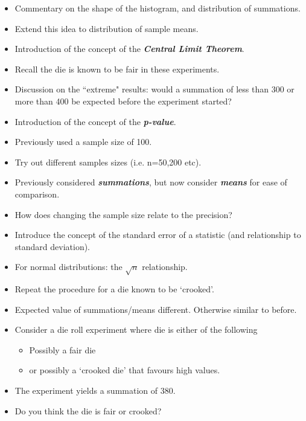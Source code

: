 \begin{frame}{\bf {}}
\begin{itemize}\itemsep0.3cm
\item Commentary on the shape of the histogram, and distribution of summations.
\item Extend this idea to distribution of sample means.
\item Introduction of the concept of the \textbf{\emph{Central Limit Theorem}}.
\item Recall the die is known to be fair in these experiments.
\item Discussion on the ``extreme" results: would a summation of less than 300 or more than 400 be expected before the experiment started?
\item Introduction of the concept of the \textbf{\emph{p-value}}.
\end{itemize}
\end{frame}
\begin{frame}{\bf {}}
\begin{itemize}\itemsep0.3cm
\item Previously used a sample size of 100.
\item Try out different samples sizes (i.e. n=50,200 etc).
\item Previously considered \textbf{\emph{summations}}, but now consider \textbf{\emph{means}} for ease of comparison.
\item How does changing the sample size relate to the precision?

\item Introduce the concept of the standard error of a statistic (and relationship to standard deviation).
\item For normal distributions: the $\sqrt{n}$ relationship.
\end{itemize}
\end{frame}


\begin{frame}{\bf {}}
\begin{itemize}\itemsep0.3cm
\item Repeat the procedure for a die known to be `crooked'.
\item Expected value of summations/means different. Otherwise similar to before.
\item Consider a die roll experiment where die is either of the following
 \begin{itemize} \item Possibly a fair die \item or possibly a `crooked die' that favours high values.
\end{itemize}
\item The experiment yields a summation of 380.
\item Do you think the die is fair or crooked?
\end{itemize}
\end{frame}


